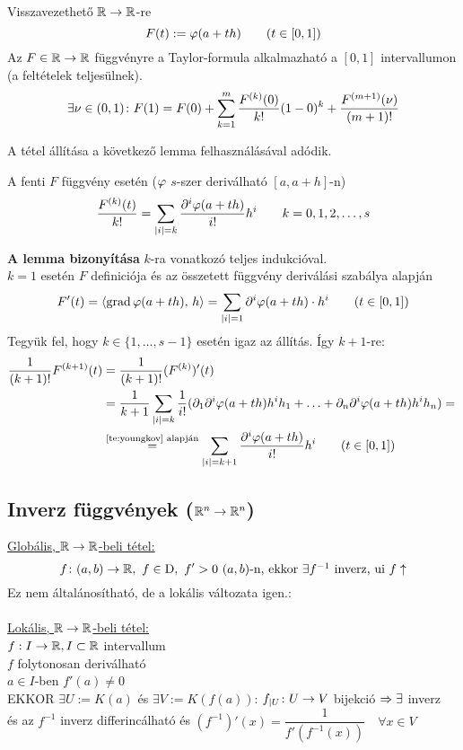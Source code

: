 \begin{biz}Visszavezethető $\mathbb{R}\to\mathbb{R}$-re\\
  \[ F(t) := \varphi(a+th)\qquad(t\in[0,1])\]
  Az $F\in\mathbb{R}\to\mathbb{R}$ függvényre a Taylor-formula alkalmazható a $[0,1]$ intervallumon (a feltételek teljesülnek).\\
  \[\displaystyle\exists \nu\in(0,1)\colon F(1) = F(0) + \sum_{k=1}^m \dfrac{F^{(k)}(0)}{k!} (1-0)^k + 
  \dfrac{F^{(m+1)}(\nu)} {(m+1)!}\]
  
  A tétel állítása a következő lemma felhasználásával adódik.
  \begin{lemma} A fenti $F$ függvény esetén ($\varphi$ $s$-szer deriválható $[a,a+h]$-n)
    \[\displaystyle\dfrac{F^{(k)}(t)}{k!}= \sum_{|i|=k}\dfrac{\partial^i\varphi(a+th)}{i!}h^i\qquad k=0,1,2,\dotsc,s\]
  \end{lemma}
  \textbf{A lemma bizonyítása} $k$-ra vonatkozó teljes indukcióval.\\
  $k=1$ esetén $F$ definiciója és az összetett függvény deriválási szabálya alapján
  \[ F'(t) = \langle\operatorname{grad} \varphi(a+th),\,h\rangle = \sum_{|i|=1} \partial^i \varphi(a+th)\cdot h^i\qquad(t\in[0,1])\]
  Tegyük fel, hogy $k\in\{1,\dotsc,s-1\}$ esetén igaz az állítás. Így $k+1$-re:
  \begin{align*}
    \dfrac1{(k+1)!}F^{(k+1)}(t) &= \dfrac1{(k+1)!}(F^{(k)})'(t)\\
    &=\dfrac1{k+1}\sum_{|i|=k} \dfrac1{i!}
    (\partial_1\partial^i\varphi(a+th)h^ih_1+\ldots + \partial_n\partial^i\varphi(a+th)h^ih_n) ={}\\
    &\stackrel{\text{\ref{te:youngkov} alapján}}{=}
    \sum_{|i|=k+1}\dfrac{\partial^i\varphi(a+th)}{i!}h^i\qquad(t\in[0,1])
  \end{align*}
\end{biz}

\subsection{Inverz függvények ($\mathbb{R}^n\to\mathbb{R}^n$)}
\underline{Globális, $\mathbb{R}\to\mathbb{R}$-beli tétel:}\\
\[f\colon (a,b)\n\R,\ f\in\D,\ f'>0\ (a,b)$-n, ekkor $\exists f^{-1}$ inverz, ui $f\uparrow\]
Ez nem általánosítható, de a lokális változata igen.:\\\\
\underline{Lokális, $\mathbb{R}\to\mathbb{R}$-beli tétel:}\\
$f: I\to \mathbb{R}, I\subset\mathbb{R}$ intervallum\\
$f$ folytonosan deriválható\\
$a\in I$-ben $f'(a)\neq 0$\\
EKKOR $\exists U := K(a)$ és $\exists V:= K(f(a))$: $f_{|U}\colon U\to V$ bijekció $\Rightarrow \exists$ inverz\\
és az $f^{-1}$ inverz differincálható és $\left(f^{-1}\right)'(x) = \dfrac1{f'(f^{-1}(x))}\quad\forall x\in V$


